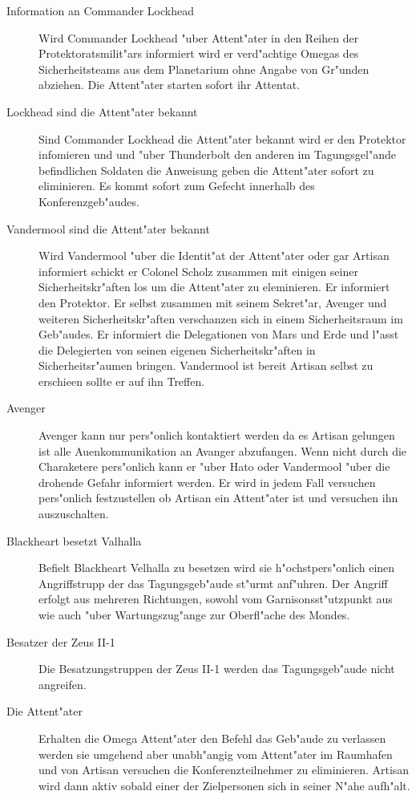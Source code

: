 \begin{description}
	\item[Information an Commander Lockhead] Wird Commander Lockhead "uber Attent"ater in den Reihen der Protektoratsmilit"ars informiert 
		wird er verd"achtige Omegas des Sicherheitsteams aus dem Planetarium ohne Angabe von Gr"unden abziehen. Die Attent"ater starten sofort ihr Attentat.
	\item[Lockhead sind die Attent"ater bekannt] Sind Commander Lockhead die Attent"ater bekannt wird er den Protektor infomieren und 
		und "uber Thunderbolt den anderen im Tagungsgel"ande befindlichen Soldaten die Anweisung geben die Attent"ater sofort zu eliminieren. Es kommt sofort zum Gefecht innerhalb des Konferenzgeb"audes.
	\item[Vandermool sind die Attent"ater bekannt] Wird Vandermool "uber die Identit"at der Attent"ater oder gar Artisan informiert schickt 	er Colonel Scholz zusammen mit einigen seiner Sicherheitskr"aften los um die Attent"ater zu eleminieren. Er informiert den 
		Protektor. Er selbst zusammen mit seinem Sekret"ar, Avenger und weiteren Sicherheitskr"aften verschanzen sich in einem Sicherheitsraum im Geb"audes. Er informiert die Delegationen von Mars und Erde und l"asst die Delegierten von seinen eigenen Sicherheitskr"aften in Sicherheitsr"aumen bringen. Vandermool ist bereit Artisan selbst zu erschie\3en sollte er auf ihn Treffen.
	\item[Avenger] Avenger kann nur pers"onlich kontaktiert werden da es Artisan gelungen ist alle Au\3enkommunikation an Avanger 	
		abzufangen. Wenn nicht durch die Charaketere pers"onlich kann er "uber Hato oder Vandermool "uber die drohende Gefahr informiert werden. Er wird in jedem Fall versuchen pers"onlich festzustellen ob Artisan ein Attent"ater ist und versuchen ihn auszuschalten.
	\item[Blackheart besetzt Valhalla] Befielt Blackheart Velhalla zu besetzen wird sie h"ochstpers"onlich einen Angriffstrupp der das 
		Tagungsgeb"aude st"urmt anf"uhren. Der Angriff erfolgt aus mehreren Richtungen, sowohl vom Garnisonsst"utzpunkt aus wie auch "uber Wartungszug"ange zur Oberfl"ache des Mondes.
	\item[Besatzer der Zeus II-1] Die Besatzungstruppen der Zeus II-1 werden das Tagungsgeb"aude nicht angreifen.
	\item[Die Attent"ater] Erhalten die Omega Attent"ater den Befehl das Geb"aude zu verlassen werden sie umgehend aber unabh"angig vom 
		Attent"ater im Raumhafen und von Artisan versuchen die Konferenzteilnehmer zu eliminieren. Artisan wird dann aktiv sobald einer der Zielpersonen sich in seiner N"ahe aufh"alt.
\end{description}


